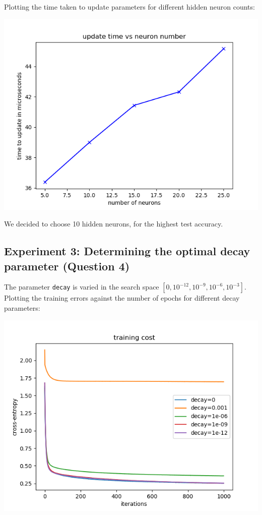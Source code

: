 Plotting the time taken to update parameters for different hidden neuron counts:

\begin{center}
    \includegraphics[width=\imgw]{images/p1a3_neuron_times.png}   
\end{center}

We decided to choose 10 hidden neurons, for the highest test accuracy.

\subsection*{Experiment 3: Determining the optimal decay parameter (Question 4)}

The parameter \texttt{decay} is varied in the search space
\([0, 10^{-12}, 10^{-9}, 10^{-6}, 10^{-3}]\).
Plotting the training errors against the number of epochs for different decay
parameters:

\begin{center}
    \includegraphics[width=\imgw]{images/p1a4_decay_cost.png}   
\end{center}

